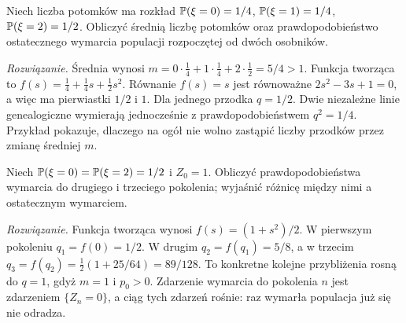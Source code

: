 \begin{zadanie}
Niech liczba potomków ma rozkład
$\mathbb{P}(\xi=0)=1/4$, $\mathbb{P}(\xi=1)=1/4$,
$\mathbb{P}(\xi=2)=1/2$. Obliczyć średnią liczbę potomków
oraz prawdopodobieństwo ostatecznego wymarcia populacji
rozpoczętej od dwóch osobników.

\emph{Rozwiązanie.} Średnia wynosi
$m=0\cdot\tfrac14+1\cdot\tfrac14+2\cdot\tfrac12=5/4>1$.
Funkcja tworząca to
$f(s)=\tfrac14+\tfrac14s+\tfrac12s^2$. Równanie
$f(s)=s$ jest równoważne $2s^2-3s+1=0$,
a więc ma pierwiastki $1/2$ i $1$. Dla jednego przodka
$q=1/2$. Dwie niezależne linie genealogiczne wymierają
jednocześnie z prawdopodobieństwem $q^2=1/4$.
Przykład pokazuje, dlaczego na ogół nie wolno zastąpić
liczby przodków przez zmianę średniej $m$.
\end{zadanie}


\begin{zadanie}
Niech $\mathbb{P}(\xi=0)=\mathbb{P}(\xi=2)=1/2$ i $Z_0=1$.
Obliczyć prawdopodobieństwa wymarcia do drugiego i trzeciego
pokolenia; wyjaśnić różnicę między nimi a ostatecznym wymarciem.

\emph{Rozwiązanie.} Funkcja tworząca wynosi
$f(s)=(1+s^2)/2$. W pierwszym pokoleniu
$q_1=f(0)=1/2$. W drugim $q_2=f(q_1)=5/8$,
a w trzecim $q_3=f(q_2)=\tfrac12(1+25/64)=89/128$.
To konkretne kolejne przybliżenia rosną do $q=1$,
gdyż $m=1$ i $p_0>0$. Zdarzenie wymarcia do pokolenia
$n$ jest zdarzeniem $\{Z_n=0\}$, a ciąg tych zdarzeń
rośnie: raz wymarła populacja już się nie odradza.
\end{zadanie}

